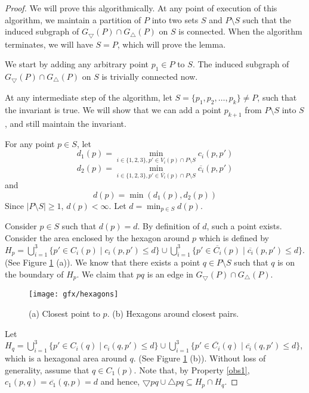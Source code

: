 \begin{proof}
 We will prove this algorithmically. At any point of execution of this algorithm, we maintain a partition of $P$ into two sets $S$ and $P \setminus S$ 
such that the induced subgraph of $G_\bigtriangledown(P) \cap G_\bigtriangleup(P)$ on $S$ is connected. When the algorithm terminates, 
we will 
have $S=P$, which will prove the lemma.

 We start by adding any arbitrary point $p_1 \in P$ to $S$. The induced subgraph of $G_\bigtriangledown(P) \cap G_\bigtriangleup(P)$ on $S$ is 
trivially connected now. 
 
 At any intermediate step of the algorithm, let $S = \{p_1, p_2, \ldots, p_k \} \ne P$, such that the invariant is true. We will show that we can add 
a point $p_{k+1}$ from $P \setminus S$ into $S$, and still maintain the invariant. 

 For any point $p\in S$, let 
$$d_1(p) = \displaystyle\min_{i \in \{1, 2, 3\}, p' \in V_i(p) \cap P \setminus S}c_i(p, p')$$ 
$$d_2(p) = \displaystyle\min_{i \in \{1, 2, 3\}, p' \in \overline{V_i}(p)\cap P \setminus S}\overline{c_i}(p, p')$$ and 
$$d(p)=\min(d_1(p), d_2(p))$$
Since $|P\setminus S|\ge 1$, $d(p) < \infty$. Let $d=\displaystyle \min_{p \in S} d(p)$. 

Consider $p \in S$ such that $d(p)= d$. By definition of $d$, such a point exists. Consider the area enclosed by the hexagon around 
$p$ which is defined by 
$H_p=\displaystyle\bigcup_{i=1}^3 \{p' \in C_i(p) \mid c_i(p, p') \le d\} \cup \displaystyle\bigcup_{i=1}^3 \{p' \in \overline{C_i}(p)\mid \overline{c_i}(p, p') \le d\}$. (See Figure \ref{Fighexagon} (a)). 
We know that there exists a point $q \in P \setminus S$ such that $q$ is on the boundary of $H_p$. 
We claim that $pq$ is an edge in $G_\bigtriangledown(P) \cap G_\bigtriangleup(P)$. 

\begin{figure}[h]
  \centering
  \texttt{[image: gfx/hexagons]}   %
  \caption{(a) Closest point to $p$. (b) Hexagons around closest pairs.}
\label{Fighexagon}
  \end{figure} 

Let $H_q=\displaystyle\bigcup_{i=1}^3 \{p' \in C_i(q) \mid c_i(q, p') \le d\} \cup \displaystyle\bigcup_{i=1}^3 \{p' \in \overline{C_i}(q)\mid \overline{c_i}(q, p') \le d\}$, 
which is a hexagonal area around $q$. (See Figure \ref{Fighexagon} (b)). Without loss of generality, assume that $q \in C_1(p)$. 
Note that, by Property \ref{obs1}, $c_1(p, q)=\overline{c_1}(q, p)=d$ and hence, $\bigtriangledown pq \cup \bigtriangleup pq \subseteq H_p \cap H_q$. 


\end{proof}
